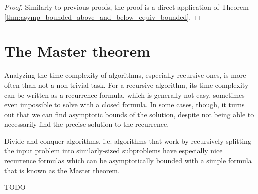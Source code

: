 \begin{proof}
    \leanok
    Similarly to previous proofs, the proof is a direct application of Theorem 
    \ref{thm:asymp_bounded_above_and_below_equiv_bounded}.
\end{proof}


\section{The Master theorem}

Analyzing the time complexity of algorithms, especially recursive ones, is more often 
than not a non-trivial task. For a recursive algorithm, its time complexity can be 
written as a recurrence formula, which is generally not easy, sometimes even impossible 
to solve with a closed formula. In some cases, though, it turns out that we can find 
asymptotic bounds of the solution, despite not being able to necessarily find the 
precise solution to the recurrence.

Divide-and-conquer algorithms, i.e. algorithms that work by recursively splitting the input 
problem into similarly-sized subproblems have especially nice recurrence formulas which can be 
asymptotically bounded with a simple formula that is known as the Master theorem.

\begin{theorem}
TODO
\end{theorem}
